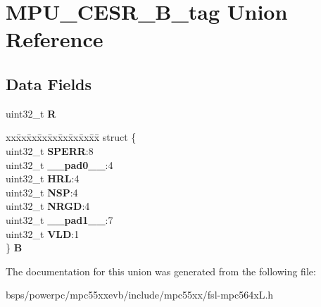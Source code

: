 \hypertarget{unionMPU__CESR__32B__tag}{}\section{M\+P\+U\+\_\+\+C\+E\+S\+R\+\_\+B\+\_\+tag Union Reference}
\label{unionMPU__CESR__32B__tag}
\subsection*{Data Fields}
\begin{DoxyCompactItemize}
\item 
\mbox{\label{unionMPU__CESR__32B__tag_a80d048fcafa0d662f1b3c85f57fbf0f4}} 
uint32\+\_\+t {\bfseries R}
\item 
\mbox{\label{unionMPU__CESR__32B__tag_a2afe6115d014c36714bc698e841fb591}} 
\begin{tabbing}
xx\=xx\=xx\=xx\=xx\=xx\=xx\=xx\=xx\=\kill
struct \{\\
\>uint32\_t {\bfseries SPERR}:8\\
\>uint32\_t {\bfseries \_\_pad0\_\_}:4\\
\>uint32\_t {\bfseries HRL}:4\\
\>uint32\_t {\bfseries NSP}:4\\
\>uint32\_t {\bfseries NRGD}:4\\
\>uint32\_t {\bfseries \_\_pad1\_\_}:7\\
\>uint32\_t {\bfseries VLD}:1\\
\} {\bfseries B}\\

\end{tabbing}\end{DoxyCompactItemize}


The documentation for this union was generated from the following file\+:\begin{DoxyCompactItemize}
\item 
bsps/powerpc/mpc55xxevb/include/mpc55xx/fsl-\/mpc564x\+L.\+h\end{DoxyCompactItemize}
